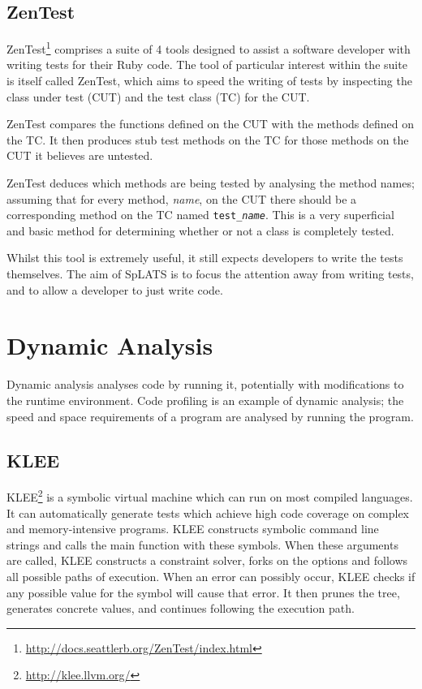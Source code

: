   \subsection{ZenTest}
    ZenTest\footnote{\url{http://docs.seattlerb.org/ZenTest/index.html}}
comprises a suite of 4 tools designed to assist a software developer with
writing tests for their Ruby code. The tool of particular interest within the suite is itself called ZenTest,
which aims to speed the writing of tests by inspecting the class under test (CUT)
and the test class (TC) for the CUT.

    ZenTest compares the functions defined on the CUT with the methods defined
on the TC. It then produces stub test methods on the TC for those methods on the
CUT it believes are untested.

ZenTest deduces which methods are being tested by analysing the method names; assuming that for every method, \emph{name}, on the CUT there should be a corresponding method on the TC named \texttt{test\_\emph{name}}. This is a very superficial and basic method for determining whether or not a class is completely tested.

    Whilst this tool is extremely useful, it still expects developers to write
the tests themselves. The aim of SpLATS is to focus the attention away from
writing tests, and to allow a developer to just write code.

\section{Dynamic Analysis} 

  Dynamic analysis analyses code by running it, potentially with modifications
  to the runtime environment. Code profiling is an example of dynamic analysis;
  the speed and space requirements of a program are analysed by running the
  program.
  
  \subsection{KLEE}
  KLEE\footnote{\url{http://klee.llvm.org/}}\cite{klee_paper} is a symbolic virtual machine which can run on most compiled languages. It can automatically generate tests which achieve high code coverage on complex and memory-intensive programs. KLEE constructs symbolic command line strings and calls the main function with these symbols. When these arguments are called, KLEE constructs a constraint solver, forks on the options and follows all possible paths of execution. When an error can possibly occur, KLEE checks if any possible value for the symbol will cause that error. It then prunes the tree, generates concrete values, and continues following the execution path.

